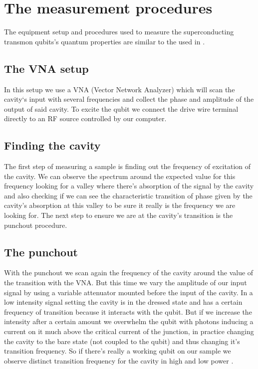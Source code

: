 \documentclass[11pt,onecolumm,a4paper]{article}
\begin{document}
\section{The measurement procedures}
The equipment setup and procedures used to measure the superconducting transmon qubits's quantum properties are similar to the used in  \cite{Naghiloo2019IntroductionQubits}. 
\subsection{The VNA setup}
In this setup we use a VNA (Vector Network Analyzer)  which will scan the cavity`s input with several frequencies and collect the phase and amplitude of the output of said cavity. To excite the qubit we connect the drive wire terminal directly to an RF source controlled by our computer.

\subsection{Finding the cavity}
The first step of measuring a sample is finding out the frequency of excitation of the cavity. We can observe the spectrum around the expected value for this frequency looking for a valley where there's absorption of the signal by the cavity and also checking if we can see the characteristic transition of phase given by the cavity's absorption at this valley to be sure it really is the frequency we are looking for. The next step to ensure we are at the cavity's transition is the punchout procedure.

\subsection{The punchout}
With the punchout we scan again the frequency of the cavity around the value of the transition with the VNA. But this time we vary the amplitude of our input signal by using a variable attenuator mounted before the input of the cavity. In a low intensity signal setting the cavity is in the dressed state and has a certain frequency of transition because it interacts with the qubit. But if we increase the intensity after a certain amount we overwhelm the qubit with photons inducing a current on it much above the critical current of the junction, in practice changing the cavity to the bare state (not coupled to the qubit) and thus changing it's transition frequency. 
So if there's really a working qubit  on our sample we observe distinct transition frequency for the cavity in high and low power \cite{Naghiloo2019IntroductionQubits}.
\end{document}
